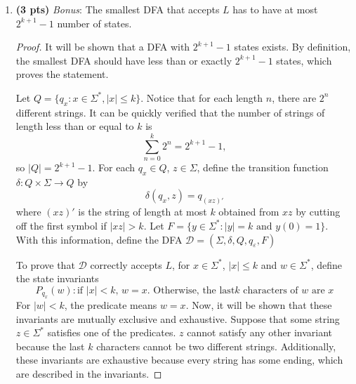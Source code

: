 \documentclass[11pt]{article}
\begin{document}
\begin{enumerate}[label=\textbf{Q\arabic*.}]
\begin{enumerate}[label=\textit{\alph*)}]
\begin{proof}
	If the transition \(q_0 \xrightarrow{1}q_0\) is always taken, \(w\) can never be accepted. On the other hand, if the transition \(q_0 \xrightarrow{1}q_1\) is taken for some \(w(i_j)\), then \(w\) is rejected by the induction hypothesis.

	By the principle of complete induction, it can be concluded that there is no path where \(\mathcal{N}\) accepts \(w \notin L\).

	Therefore, the NFA \(\mathcal{N}\) correctly accepts \(L\), completing the proof.
	\medbreak
\end{proof}

\item \textbf{(3 pts)} \textit{Bonus}: The smallest DFA that accepts $L$ has to have at most $2^{k+1}-1$ number of states.

\begin{proof}
	It will be shown that a DFA with \(2^{k+1} - 1\) states exists. By definition, the smallest DFA should have less than or exactly \(2^{k+1} - 1\) states, which proves the statement.

	Let \(Q = \{q_x : x \in \Sigma ^*, |x| \leq k \}\). Notice that for each length \(n\), there are \(2^n\) different strings. It can be quickly verified that the number of strings of length less than or equal to \(k\) is
	\[
		\sum_{n=0}^k 2^n = 2^{k+1} - 1,
	\]
	so \(|Q| = 2^{k+1} - 1\). For each \(q_x \in Q\), \(z \in \Sigma\), define the transition function \(\delta : Q \times \Sigma \to Q\) by
	\[
		\delta (q_x, z) = q_{(xz)'}
	\]
	where \((xz)'\) is the string of length at most \(k\) obtained from \(xz\) by cutting off the first symbol if \(|xz| > k\). Let \(F = \{ y \in \Sigma ^* : |y| = k \text{ and } y(0) = 1\}\). With this information, define the DFA \(\mathcal{D} = (\Sigma , \delta , Q, q_{\varepsilon}, F)\) 
	
	To prove that \(\mathcal{D}\) correctly accepts \(L\), for \(x \in \Sigma ^*\), \(|x| \leq k\) and \(w \in \Sigma^*\), define the state invariants
	\[
		P_{q_x}(w) : \text{if } |x| < k \text{, } w=x \text{. Otherwise, the last} k \text{ characters of } w \text{ are } x
	\]
	For \(|w| <k\), the predicate means \(w = x\). Now, it will be shown that these invariants are mutually exclusive and exhaustive. Suppose that some string \(z \in \Sigma ^*\) satisfies one of the predicates. \(z\) cannot satisfy any other invariant because the last \(k\) characters cannot be two different strings. Additionally, these invariants are exhaustive because every string has some ending, which are described in the invariants.


\end{proof}
\end{enumerate}
\end{enumerate}
\end{document}
